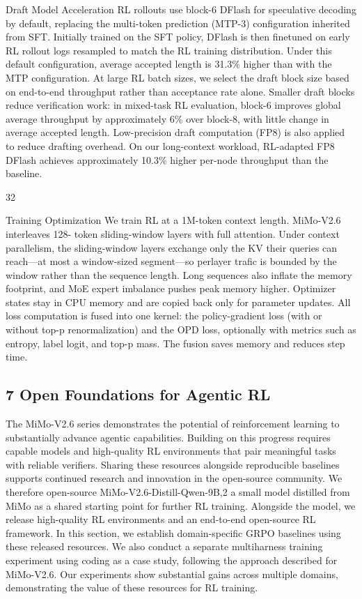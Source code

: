 \documentclass[
  10
]{article}
\begin{document}
Draft Model Acceleration RL rollouts use block-6 DFlash for speculative
decoding by default, replacing the multi-token prediction (MTP-3)
configuration inherited from SFT. Initially trained on the SFT policy,
DFlash is then finetuned on early RL rollout logs resampled to match the
RL training distribution. Under this default configuration, average
accepted length is 31.3\% higher than with the MTP configuration. At
large RL batch sizes, we select the draft block size based on end-to-end
throughput rather than acceptance rate alone. Smaller draft blocks
reduce verification work: in mixed-task RL evaluation, block-6 improves
global average throughput by approximately 6\% over block-8, with little
change in average accepted length. Low-precision draft computation (FP8)
is also applied to reduce drafting overhead. On our long-context
workload, RL-adapted FP8 DFlash achieves approximately 10.3\% higher
per-node throughput than the baseline.

32

Training Optimization We train RL at a 1M-token context length.
MiMo-V2.6 interleaves 128- token sliding-window layers with full
attention. Under context parallelism, the sliding-window layers exchange
only the KV their queries can reach---at most a window-sized
segment---so perlayer trafic is bounded by the window rather than the
sequence length. Long sequences also inflate the memory footprint, and
MoE expert imbalance pushes peak memory higher. Optimizer states stay in
CPU memory and are copied back only for parameter updates. All loss
computation is fused into one kernel: the policy-gradient loss (with or
without top-p renormalization) and the OPD loss, optionally with metrics
such as entropy, label logit, and top-p mass. The fusion saves memory
and reduces step time.

\subsection{7 Open Foundations for Agentic
RL}\label{open-foundations-for-agentic-rl}

The MiMo-V2.6 series demonstrates the potential of reinforcement
learning to substantially advance agentic capabilities. Building on this
progress requires capable models and high-quality RL environments that
pair meaningful tasks with reliable verifiers. Sharing these resources
alongside reproducible baselines supports continued research and
innovation in the open-source community. We therefore open-source
MiMo-V2.6-Distill-Qwen-9B,2 a small model distilled from MiMo as a
shared starting point for further RL training. Alongside the model, we
release high-quality RL environments and an end-to-end open-source RL
framework. In this section, we establish domain-specific GRPO baselines
using these released resources. We also conduct a separate multiharness
training experiment using coding as a case study, following the approach
described for MiMo-V2.6. Our experiments show substantial gains across
multiple domains, demonstrating the value of these resources for RL
training.
\end{document}
